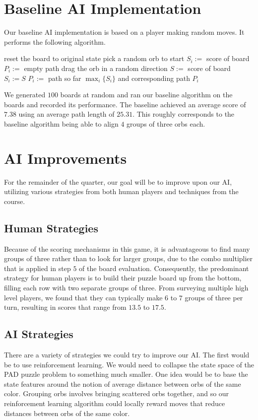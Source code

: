 \documentclass[journal,final,letterpaper,11pt]{IEEEtran}
\begin{document}
\vspace*{-0.1in}
\section{Baseline AI Implementation}
Our baseline AI implementation is based on a player making random moves. It performs the following algorithm.
\begin{algorithmic}[1]
  \STATE reset the board to original state
  \STATE pick a random orb to start
  \STATE $S_i :=$ score of board
  \STATE $P_i :=$ empty path
    \STATE drag the orb in a random direction
    \STATE $S :=$ score of board
      \STATE $S_i := S$
      \STATE $P_i :=$ path so far
    \ENDIF
  \ENDFOR
\ENDFOR
\RETURN $\max_{i}\{S_i\}$ and corresponding path $P_i$
\end{algorithmic}
We generated $100$ boards at random and ran our baseline algorithm on the boards and recorded its performance. The baseline achieved an average score of $7.38$ using an average path length of $25.31$. This roughly corresponds to the baseline algorithm being able to align $4$ groups of three orbs each.

\vspace*{-0.1in}
\section{AI Improvements}
For the remainder of the quarter, our goal will be to improve upon our AI, utilizing various strategies from both human players and techniques from the course.
\vspace*{-0.15in}
\subsection{Human Strategies}
Because of the scoring mechanisms in this game, it is advantageous to find many groups of three rather than to look for larger groups, due to the combo multiplier that is applied in step $5$ of the board evaluation. Consequently, the predominant strategy for human players is to build their puzzle board up from the bottom, filling each row with two separate groups of three. From surveying multiple high level players, we found that they can typically make $6$ to $7$ groups of three per turn, resulting in scores that range from $13.5$ to $17.5$.
\vspace*{-0.15in}
\subsection{AI Strategies}
There are a variety of strategies we could try to improve our AI. The first would be to use reinforcement learning. We would need to collapse the state space of the PAD puzzle problem to something much smaller. One idea would be to base the state features around the notion of average distance between orbs of the same color. Grouping orbs involves bringing scattered orbs together, and so our reinforcement learning algorithm could locally reward moves that reduce distances between orbs of the same color.
\vspace*{-0.1in}
\end{document}
